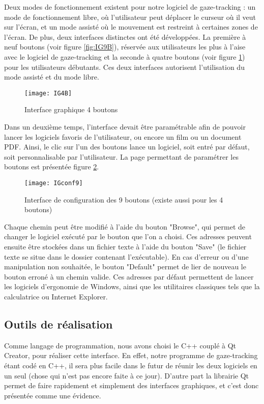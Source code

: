 Deux modes de fonctionnement existent pour notre logiciel de gaze-tracking : un mode de fonctionnement libre, où l’utilisateur peut déplacer le curseur où il veut sur l’écran, et un mode assisté où le mouvement est restreint à certaines zones de l’écran. De plus, deux interfaces distinctes ont été développées. La première à neuf boutons (voir figure \ref{fig:IG9B}), réservée aux utilisateurs les plus à l’aise avec le logiciel de gaze-tracking et la seconde à quatre boutons (voir figure \ref{fig:IG4B}) pour les utilisateurs débutants. Ces deux interfaces autorisent l’utilisation du mode assisté et du mode libre.

\begin{figure}[H]
  \centering
  \texttt{[image: IG4B]}
  \caption{Interface graphique 4 boutons}
  \label{fig:IG4B}
\end{figure}

Dans un deuxième temps, l’interface devait être paramétrable afin de pouvoir lancer les logiciels favoris de l’utilisateur, ou encore un film ou un document PDF. Ainsi, le clic sur l’un des boutons lance un logiciel, soit entré par défaut, soit personnalisable par l’utilisateur. La page permettant de paramétrer les boutons est présentée figure \ref{fig:IGconf9}.

\begin{figure}[H]
  \centering
  \texttt{[image: IGconf9]}
  \caption{Interface de configuration des 9 boutons (existe aussi pour les 4 boutons)}
  \label{fig:IGconf9}
\end{figure}

Chaque chemin peut être modifié à l’aide du bouton "Browse", qui permet de changer le logiciel exécuté par le bouton que l’on a choisi. Ces adresses peuvent ensuite être stockées dans un fichier texte à l’aide du bouton "Save" (le fichier texte se situe dans le dossier contenant l’exécutable). En cas d’erreur ou d’une manipulation non souhaitée, le bouton "Default" permet de lier de nouveau le bouton erroné à un chemin valide. Ces adresses par défaut permettent de lancer les logiciels d’ergonomie de Windows, ainsi que les utilitaires classiques tels que la calculatrice ou Internet Explorer.

\subsection{Outils de réalisation}

Comme langage de programmation, nous avons choisi le C++ couplé à Qt Creator, pour réaliser cette interface. En effet, notre programme de gaze-tracking étant codé en C++, il sera plus facile dans le futur de réunir les deux logiciels en un seul (chose qui n’est pas encore faite à ce jour). D’autre part la librairie Qt permet de faire rapidement et simplement des interfaces graphiques, et c’est donc présentée comme une évidence.

